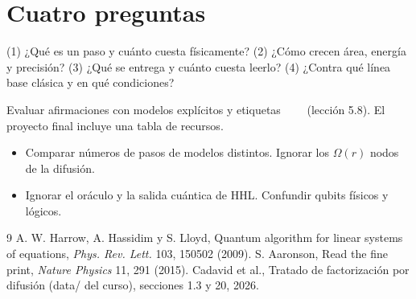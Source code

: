 \documentclass[11pt,a4paper]{article}
\begin{document}
\section{Cuatro preguntas}
(1) ¿Qué es un paso y cuánto cuesta físicamente? (2) ¿Cómo crecen área, energía y precisión? (3) ¿Qué se entrega y cuánto cuesta leerlo? (4) ¿Contra qué línea base
clásica y en qué condiciones?

\begin{aplicacion}
Evaluar afirmaciones con modelos explícitos y etiquetas \evM\ \evS\ \evP\ \evE\ (lección 5.8). El proyecto final incluye una tabla de recursos.
\end{aplicacion}

\begin{error}
\begin{itemize}[nosep]
\item Comparar números de pasos de modelos distintos. \quad Ignorar los $\Omega(r)$ nodos de la difusión.
\item Ignorar el oráculo y la salida cuántica de HHL. \quad Confundir qubits físicos y lógicos.
\end{itemize}
\end{error}

\begin{thebibliography}{9}\small
{} A. W. Harrow, A. Hassidim y S. Lloyd, Quantum algorithm for linear systems of equations, \emph{Phys. Rev. Lett.} 103, 150502 (2009).
 S. Aaronson, Read the fine print, \emph{Nature Physics} 11, 291 (2015).
 Cadavid et al., Tratado de factorización por difusión (data/ del curso), secciones 1.3 y 20, 2026.
\end{thebibliography}
\end{document}
